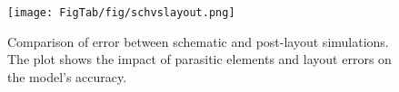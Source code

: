 \begin{figure}[t]
\centering
\texttt{[image: FigTab/fig/schvslayout.png]}
\caption{Comparison of error between schematic and post-layout simulations. The plot shows the impact of parasitic elements and layout errors on the model's accuracy. } \label{fig:schevslayout}
\vspace{-2ex}
\end{figure}